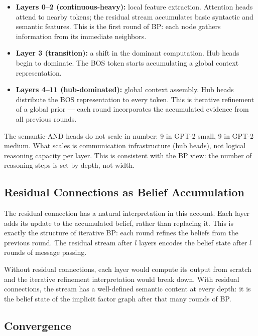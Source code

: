 \begin{itemize}
\item \textbf{Layers 0--2 (continuous-heavy):} local feature extraction. Attention
heads attend to nearby tokens; the residual stream accumulates basic syntactic and
semantic features. This is the first round of BP: each node gathers information
from its immediate neighbors.

\item \textbf{Layer 3 (transition):} a shift in the dominant computation. Hub heads
begin to dominate. The BOS token starts accumulating a global context representation.

\item \textbf{Layers 4--11 (hub-dominated):} global context assembly. Hub heads
distribute the BOS representation to every token. This is iterative refinement of
a global prior --- each round incorporates the accumulated evidence from all previous
rounds.
\end{itemize}

The semantic-AND heads do not scale in number: 9 in GPT-2 small, 9 in GPT-2 medium.
What scales is communication infrastructure (hub heads), not logical reasoning
capacity per layer. This is consistent with the BP view: the number of reasoning
steps is set by depth, not width.

\subsection*{Residual Connections as Belief Accumulation}

The residual connection has a natural interpretation in this account. Each layer
adds its update to the accumulated belief, rather than replacing it. This is exactly
the structure of iterative BP: each round refines the beliefs from the previous
round. The residual stream after $l$ layers encodes the belief state after $l$ rounds
of message passing.

Without residual connections, each layer would compute its output from scratch and
the iterative refinement interpretation would break down. With residual connections,
the stream has a well-defined semantic content at every depth: it is the belief state
of the implicit factor graph after that many rounds of BP.

\subsection*{Convergence}

